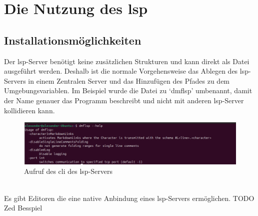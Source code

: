 \documentclass[./einleitung.tex]{subfiles}
\begin{document}
    \section{Die Nutzung des \acrshort{lsp}}
    \subsection{Installationsmöglichkeiten}
    Der \acrshort{lsp}-Server benötigt keine zusätzlichen Strukturen und kann direkt als Datei ausgeführt werden.
    Deshalb ist die normale Vorgehensweise das Ablegen des \acrshort{lsp}-Servers in einem Zentralen Server und das Hinzufügen des Pfades zu dem Umgebungsvariablen.
    Im Beispiel wurde die Datei zu `dmflsp' umbenannt, damit der Name genauer das Programm beschreibt und nicht mit anderen \acrshort{lsp}-Server kollidieren kann.\\
    \begin{figure}[h]
        \centering
        \includegraphics[width=\linewidth]{bilder/screenshot-lsp-help}
        \caption{Aufruf des \acrshort{cli} des \acrshort{lsp}-Servers}
        \label{fig:screenshot-lsp-help}
    \end{figure}\\
    Es gibt Editoren die eine native Anbindung eines \acrshort{lsp}-Servers ermöglichen.
        {\footnotesize TODO Zed Besspiel }
\end{document}
